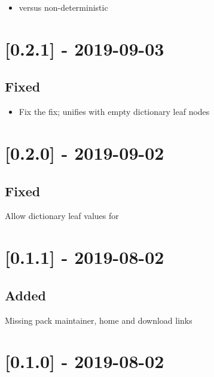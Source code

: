 \begin{itemize}
    \item {} versus non-deterministic 
\end{itemize}

\section{[0.2.1] - 2019-09-03}

\subsection{Fixed}

\begin{itemize}
    \item Fix the fix;  unifies with empty dictionary leaf nodes
\end{itemize}

\section{[0.2.0] - 2019-09-02}

\subsection{Fixed}

\begin{shortlist}
    \item Allow dictionary leaf values for 
\end{shortlist}

\section{[0.1.1] - 2019-08-02}

\subsection{Added}

\begin{shortlist}
    \item Missing pack maintainer, home and download links
\end{shortlist}

\section{[0.1.0] - 2019-08-02}

